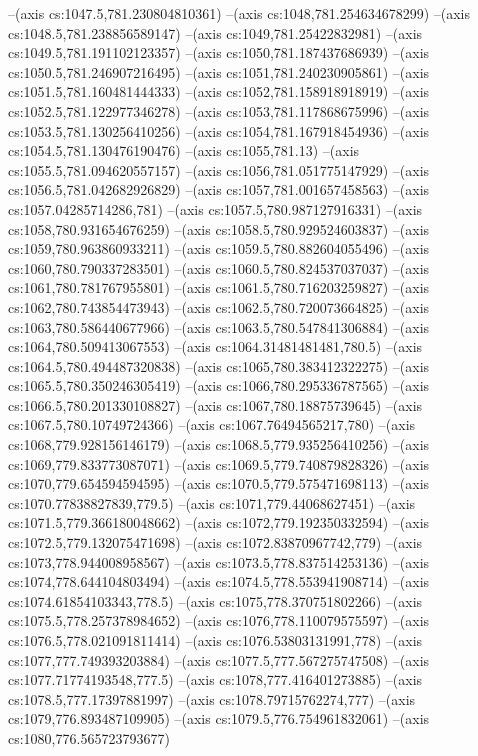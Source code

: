 --(axis cs:1047.5,781.230804810361)
--(axis cs:1048,781.254634678299)
--(axis cs:1048.5,781.238856589147)
--(axis cs:1049,781.25422832981)
--(axis cs:1049.5,781.191102123357)
--(axis cs:1050,781.187437686939)
--(axis cs:1050.5,781.246907216495)
--(axis cs:1051,781.240230905861)
--(axis cs:1051.5,781.160481444333)
--(axis cs:1052,781.158918918919)
--(axis cs:1052.5,781.122977346278)
--(axis cs:1053,781.117868675996)
--(axis cs:1053.5,781.130256410256)
--(axis cs:1054,781.167918454936)
--(axis cs:1054.5,781.130476190476)
--(axis cs:1055,781.13)
--(axis cs:1055.5,781.094620557157)
--(axis cs:1056,781.051775147929)
--(axis cs:1056.5,781.042682926829)
--(axis cs:1057,781.001657458563)
--(axis cs:1057.04285714286,781)
--(axis cs:1057.5,780.987127916331)
--(axis cs:1058,780.931654676259)
--(axis cs:1058.5,780.929524603837)
--(axis cs:1059,780.963860933211)
--(axis cs:1059.5,780.882604055496)
--(axis cs:1060,780.790337283501)
--(axis cs:1060.5,780.824537037037)
--(axis cs:1061,780.781767955801)
--(axis cs:1061.5,780.716203259827)
--(axis cs:1062,780.743854473943)
--(axis cs:1062.5,780.720073664825)
--(axis cs:1063,780.586440677966)
--(axis cs:1063.5,780.547841306884)
--(axis cs:1064,780.509413067553)
--(axis cs:1064.31481481481,780.5)
--(axis cs:1064.5,780.494487320838)
--(axis cs:1065,780.383412322275)
--(axis cs:1065.5,780.350246305419)
--(axis cs:1066,780.295336787565)
--(axis cs:1066.5,780.201330108827)
--(axis cs:1067,780.18875739645)
--(axis cs:1067.5,780.10749724366)
--(axis cs:1067.76494565217,780)
--(axis cs:1068,779.928156146179)
--(axis cs:1068.5,779.935256410256)
--(axis cs:1069,779.833773087071)
--(axis cs:1069.5,779.740879828326)
--(axis cs:1070,779.654594594595)
--(axis cs:1070.5,779.575471698113)
--(axis cs:1070.77838827839,779.5)
--(axis cs:1071,779.44068627451)
--(axis cs:1071.5,779.366180048662)
--(axis cs:1072,779.192350332594)
--(axis cs:1072.5,779.132075471698)
--(axis cs:1072.83870967742,779)
--(axis cs:1073,778.944008958567)
--(axis cs:1073.5,778.837514253136)
--(axis cs:1074,778.644104803494)
--(axis cs:1074.5,778.553941908714)
--(axis cs:1074.61854103343,778.5)
--(axis cs:1075,778.370751802266)
--(axis cs:1075.5,778.257378984652)
--(axis cs:1076,778.110079575597)
--(axis cs:1076.5,778.021091811414)
--(axis cs:1076.53803131991,778)
--(axis cs:1077,777.749393203884)
--(axis cs:1077.5,777.567275747508)
--(axis cs:1077.71774193548,777.5)
--(axis cs:1078,777.416401273885)
--(axis cs:1078.5,777.17397881997)
--(axis cs:1078.79715762274,777)
--(axis cs:1079,776.893487109905)
--(axis cs:1079.5,776.754961832061)
--(axis cs:1080,776.565723793677)

